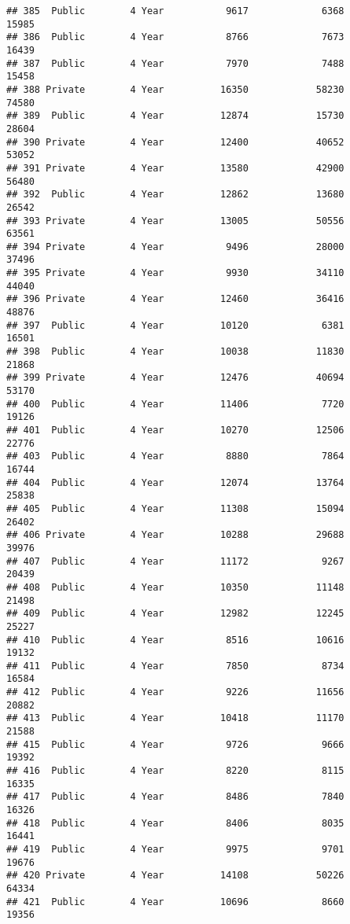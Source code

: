 \documentclass[
]{article}
\begin{document}
\begin{verbatim}
## 385  Public        4 Year           9617             6368          15985
## 386  Public        4 Year           8766             7673          16439
## 387  Public        4 Year           7970             7488          15458
## 388 Private        4 Year          16350            58230          74580
## 389  Public        4 Year          12874            15730          28604
## 390 Private        4 Year          12400            40652          53052
## 391 Private        4 Year          13580            42900          56480
## 392  Public        4 Year          12862            13680          26542
## 393 Private        4 Year          13005            50556          63561
## 394 Private        4 Year           9496            28000          37496
## 395 Private        4 Year           9930            34110          44040
## 396 Private        4 Year          12460            36416          48876
## 397  Public        4 Year          10120             6381          16501
## 398  Public        4 Year          10038            11830          21868
## 399 Private        4 Year          12476            40694          53170
## 400  Public        4 Year          11406             7720          19126
## 401  Public        4 Year          10270            12506          22776
## 403  Public        4 Year           8880             7864          16744
## 404  Public        4 Year          12074            13764          25838
## 405  Public        4 Year          11308            15094          26402
## 406 Private        4 Year          10288            29688          39976
## 407  Public        4 Year          11172             9267          20439
## 408  Public        4 Year          10350            11148          21498
## 409  Public        4 Year          12982            12245          25227
## 410  Public        4 Year           8516            10616          19132
## 411  Public        4 Year           7850             8734          16584
## 412  Public        4 Year           9226            11656          20882
## 413  Public        4 Year          10418            11170          21588
## 415  Public        4 Year           9726             9666          19392
## 416  Public        4 Year           8220             8115          16335
## 417  Public        4 Year           8486             7840          16326
## 418  Public        4 Year           8406             8035          16441
## 419  Public        4 Year           9975             9701          19676
## 420 Private        4 Year          14108            50226          64334
## 421  Public        4 Year          10696             8660          19356

\end{verbatim}
\end{document}
